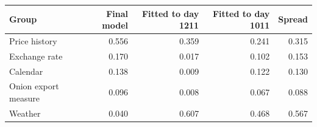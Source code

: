 \begin{tabular}{lrrrr}
\toprule
\textbf{Group} & \textbf{Final model} & \textbf{Fitted to day 1211} & \textbf{Fitted to day 1011} & \textbf{Spread} \\
\midrule
Price history & 0.556 & 0.359 & 0.241 & 0.315 \\
Exchange rate & 0.170 & 0.017 & 0.102 & 0.153 \\
Calendar & 0.138 & 0.009 & 0.122 & 0.130 \\
Onion export measure & 0.096 & 0.008 & 0.067 & 0.088 \\
Weather & 0.040 & 0.607 & 0.468 & 0.567 \\
\bottomrule
\end{tabular}
